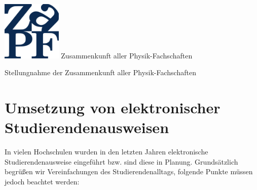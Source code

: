 \documentclass[DIV=calc]{scrartcl}
\begin{document}
\hspace{0.87\textwidth}
\begin{minipage}{120pt}
\vspace{-1.8cm}
\includegraphics[width=80pt]{../../logo.pdf}
\centering
\small Zusammenkunft aller Physik-Fachschaften
\end{minipage}
\begin{center}
\huge{Stellungnahme der Zusammenkunft aller Physik-Fachschaften} \\
\normalsize
\end{center}

\vspace{1cm}
\section*{Umsetzung von elektronischer Studierendenausweisen}

In vielen Hochschulen wurden in den letzten Jahren elektronische Studierendenausweise eingeführt
bzw. sind diese in Planung. Grundsätzlich begrüßen wir Vereinfachungen des Studierendenalltags,
folgende Punkte müssen jedoch beachtet werden:
\end{document}
